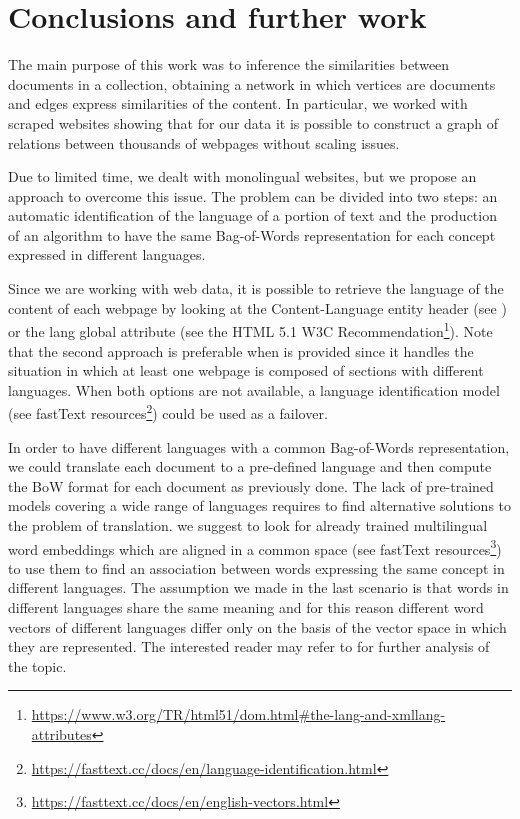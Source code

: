 \chapter{Conclusions and further work}
The main purpose of this work was to inference
the similarities between documents in a collection,
obtaining a network in which vertices are documents and
edges express similarities of the content.
In particular, we worked with scraped websites
showing that for our data it is possible to construct
a graph of relations between thousands of webpages
without scaling issues.

Due to limited time, we dealt with monolingual
websites, but we propose an approach to overcome this issue.
The problem can be divided into two steps:
an automatic identification of the language of a portion of text and
the production of an algorithm to have the same Bag-of-Words
representation for each concept expressed in different languages.

Since we are working with web data, it is possible to retrieve the language
of the content of each webpage by looking at the Content-Language entity header
(see \cite{rfc7231}) or the lang global attribute
(see the HTML 5.1 W3C Recommendation\footnote{\url{https://www.w3.org/TR/html51/dom.html\#the-lang-and-xmllang-attributes}}).
Note that the second approach is preferable when  is provided
since it handles the situation in which at least
one webpage is composed of sections with different languages.
When both options are not available,
a language identification model
(see fastText resources\footnote{\url{https://fasttext.cc/docs/en/language-identification.html}})
could be used as a failover.

In order to have different languages with a common Bag-of-Words
representation, we could translate each document to a pre-defined language
and then compute the BoW format for each document as previously done.
The lack of pre-trained models covering a wide range
of languages requires to find alternative solutions to the problem of translation.
we suggest to look for already trained multilingual word embeddings
which are aligned in a common space (see fastText resources\footnote{\url{https://fasttext.cc/docs/en/english-vectors.html}})
to use them to find an association between words expressing the same concept in different languages.
The assumption we made in the last scenario is that words in different languages share
the same meaning and for this reason different word vectors of different languages differ only on the basis
of the vector space in which they are represented.
The interested reader may refer to \cite{DBLP:journals/corr/abs-1804-07745} for further analysis of the topic.